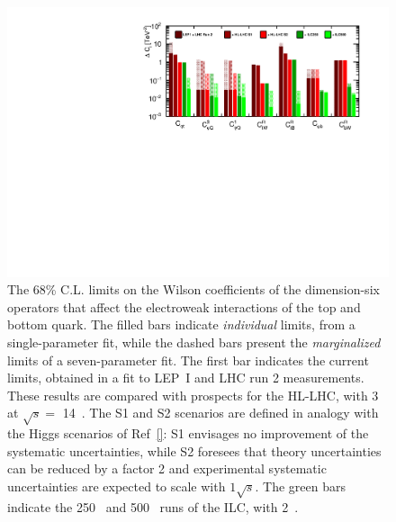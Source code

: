 \begin{figure}[tb]
 \begin{center}
 \includegraphics[width=1.0\hsize]{chapters/figures/manhattan_plot_bottom_top.pdf}
\caption{The 68\% C.L. limits on the Wilson coefficients of the dimension-six 
operators that affect the electroweak interactions of the top and bottom quark. 
The filled bars indicate {\em individual} limits, from a 
single-parameter fit, while the dashed bars present the {\em marginalized} limits of
a seven-parameter fit. 
The first bar indicates the current limits, obtained in a fit to LEP~I and LHC run 2 
measurements. These results are compared with prospects for the HL-LHC, with
3~\iab{} at $\sqrt{s}=$ 14~\TeV{}. The S1 and S2 scenarios are defined in analogy 
with the 
Higgs scenarios of Ref~\ref{}: S1 envisages no improvement of the systematic 
uncertainties, while S2 foresees that theory uncertainties can be reduced by a
factor 2 and experimental systematic uncertainties are expected to scale with
$1\sqrt{s}$. The green bars indicate the 250~\GeV{} and
500~\GeV{} runs of the ILC, with 2~\iab{}. 
\label{fig:top_bottom_ew_fit}}
 \end{center}
 \vspace{-0.7cm}
 \end{figure}

